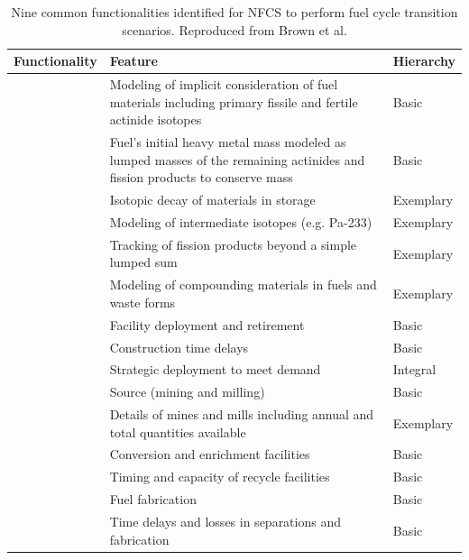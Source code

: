 \begin{table}[h]
	\centering
	\caption {Nine common functionalities identified for \gls{NFCS} to perform
		fuel cycle transition scenarios. Reproduced from Brown et al. \cite{brown_identification_2016}}
	\label{tab:ffh}
	\begin{tabularx}{\textwidth}{lXl}
		\hline
		\textbf{Functionality}&\textbf{Feature} &\textbf{Hierarchy} \\
		\hline
		 & Modeling of implicit consideration of fuel materials including primary fissile and fertile actinide isotopes & Basic \\
		& Fuel's initial heavy metal mass modeled as lumped masses  of the remaining actinides and fission products to conserve mass & Basic \\
		& Isotopic decay of materials in storage & Exemplary \\
		& Modeling of intermediate isotopes (e.g. Pa-233) & Exemplary \\
		& Tracking of fission products beyond a simple lumped sum & Exemplary \\
		& Modeling of compounding materials in fuels and waste forms & Exemplary\\
		
		\hline
		
		 & Facility deployment and retirement & Basic \\
		& Construction time delays & Basic \\
		& Strategic deployment to meet demand &Integral \\
		
		\hline
		
		 & Source (mining and milling) & Basic \\
		& Details of mines and mills including annual and total quantities available & Exemplary \\
		& Conversion and enrichment facilities & Basic \\
		& Timing and capacity of recycle facilities & Basic \\
		& Fuel fabrication & Basic \\
		& Time delays and losses in separations and fabrication & Basic \\
		

\end{tabularx}
\end{table}
